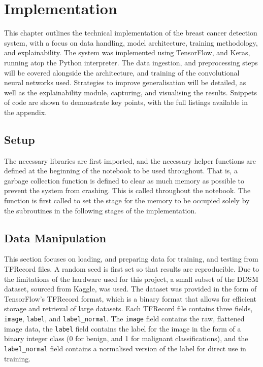 \documentclass[../main]{subfiles}
\begin{document}
\chapter{Implementation}
This chapter outlines the technical implementation of the breast cancer
detection system, with a focus on data handling, model architecture, training
methodology, and explainability. The system was implemented using TensorFlow,
and Keras, running atop the Python interpreter. The data ingestion, and
preprocessing steps will be covered alongside the architecture, and training of
the convolutional neural networks used. Strategies to improve generalisation
will be detailed, as well as the explainability module, capturing, and
visualising the results. Snippets of code are shown to demonstrate key points,
with the full listings available in the appendix.

\section{Setup}
The necessary libraries are first imported, and the necessary helper functions
are defined at the beginning of the notebook to be used throughout. That is, a
garbage collection function is defined to clear as much memory as possible to
prevent the system from crashing. This is called throughout the notebook. The
function is first called to set the stage for the memory to be occupied solely
by the subroutines in the following stages of the implementation.

\section{Data Manipulation}
This section focuses on loading, and preparing data for training, and testing
from TFRecord files. A random seed is first set so that results are
reproducible. Due to the limitations of the hardware used for this
project, a small subset of the DDSM dataset, sourced from Kaggle, was used.
The dataset was provided in the form of TensorFlow's TFRecord format, which is
a binary format that allows for efficient storage and retrieval of large
datasets. Each TFRecord file contains three fields, \texttt{image},
\texttt{label}, and \texttt{label\_normal}. The \texttt{image} field contains
the raw, flattened image data, the \texttt{label} field contains the label for
the image in the form of a binary integer class (0 for benign, and 1 for
malignant classifications), and the \texttt{label\_normal} field contains a
normalised version of the label for direct use in training.
\end{document}

